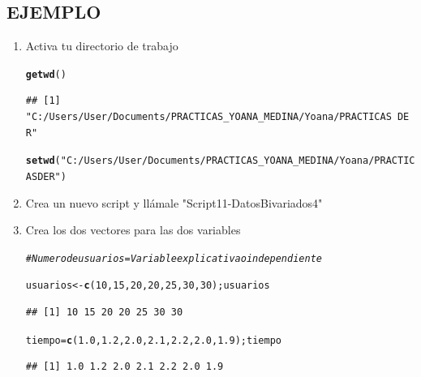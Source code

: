 \documentclass[12pt,letterpaper]{article}\usepackage[]{graphicx}\usepackage[]{color}
\makeatletter
\newcommand{\hlnum}[1]{\textcolor[rgb]{0.686,0.059,0.569}{#1}}%
\newcommand{\hlstr}[1]{\textcolor[rgb]{0.192,0.494,0.8}{#1}}%
\newcommand{\hlcom}[1]{\textcolor[rgb]{0.678,0.584,0.686}{\textit{#1}}}%
\newcommand{\hlstd}[1]{\textcolor[rgb]{0.345,0.345,0.345}{#1}}%
\newcommand{\hlkwb}[1]{\textcolor[rgb]{0.69,0.353,0.396}{#1}}%
\newcommand{\hlkwd}[1]{\textcolor[rgb]{0.737,0.353,0.396}{\textbf{#1}}}%
\newenvironment{kframe}{%
 \def\at@end@of@kframe{}%
 \ifinner\ifhmode%
  \def\at@end@of@kframe{\end{minipage}}%
  \begin{minipage}{\columnwidth}%
 \fi\fi%
 \def\FrameCommand##1{\hskip\@totalleftmargin \hskip-\fboxsep
 \colorbox{shadecolor}{##1}\hskip-\fboxsep
     \hskip-\linewidth \hskip-\@totalleftmargin \hskip\columnwidth}%
 \MakeFramed {\advance\hsize-\width
   \@totalleftmargin\z@ \linewidth\hsize
   \@setminipage}}%
 {\par\unskip\endMakeFramed%
 \at@end@of@kframe}
\newenvironment{knitrout}{}{} %
\makeatother
\begin{document}
\subsection*{EJEMPLO}

\begin{enumerate}
\item Activa tu directorio de trabajo 

\begin{knitrout}
\color{fgcolor}\begin{kframe}
\begin{alltt}
\hlkwd{getwd}\hlstd{()}
\end{alltt}
\begin{verbatim}
## [1] "C:/Users/User/Documents/PRACTICAS_YOANA_MEDINA/Yoana/PRACTICAS DE R"
\end{verbatim}
\begin{alltt}
\hlkwd{setwd}\hlstd{(}\hlstr{"C:/Users/User/Documents/PRACTICAS_YOANA_MEDINA/Yoana/PRACTICAS DE R"}\hlstd{)}
\end{alltt}
\end{kframe}
\end{knitrout}

\item Crea un nuevo script y ll\'amale "Script11-DatosBivariados4" 

\item Crea los dos vectores para las dos variables 

\begin{knitrout}
\color{fgcolor}\begin{kframe}
\begin{alltt}
\hlcom{# Numero de usuarios = Variable explicativa o independiente}

\hlstd{usuarios} \hlkwb{<-} \hlkwd{c}\hlstd{(}\hlnum{10}\hlstd{,} \hlnum{15}\hlstd{,} \hlnum{20}\hlstd{,} \hlnum{20}\hlstd{,} \hlnum{25}\hlstd{,} \hlnum{30}\hlstd{,} \hlnum{30}\hlstd{); usuarios}
\end{alltt}
\begin{verbatim}
## [1] 10 15 20 20 25 30 30
\end{verbatim}
\begin{alltt}
\hlstd{tiempo} \hlkwb{=} \hlkwd{c}\hlstd{(}\hlnum{1.0}\hlstd{,} \hlnum{1.2}\hlstd{,} \hlnum{2.0}\hlstd{,} \hlnum{2.1}\hlstd{,} \hlnum{2.2}\hlstd{,} \hlnum{2.0}\hlstd{,} \hlnum{1.9}\hlstd{); tiempo}
\end{alltt}
\begin{verbatim}
## [1] 1.0 1.2 2.0 2.1 2.2 2.0 1.9
\end{verbatim}
\end{kframe}
\end{knitrout}


\end{enumerate}
\end{document}
